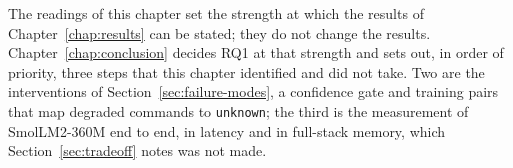 The readings of this chapter set the strength at which the results of Chapter~\ref{chap:results}
can be stated; they do not change the results. Chapter~\ref{chap:conclusion} decides RQ1 at that
strength and sets out, in order of priority, three steps that this chapter identified and did not
take. Two are the interventions of Section~\ref{sec:failure-modes}, a confidence gate and training
pairs that map degraded commands to \texttt{unknown}; the third is the measurement of
SmolLM2-360M end to end, in latency and in full-stack memory, which Section~\ref{sec:tradeoff}
notes was not made.

